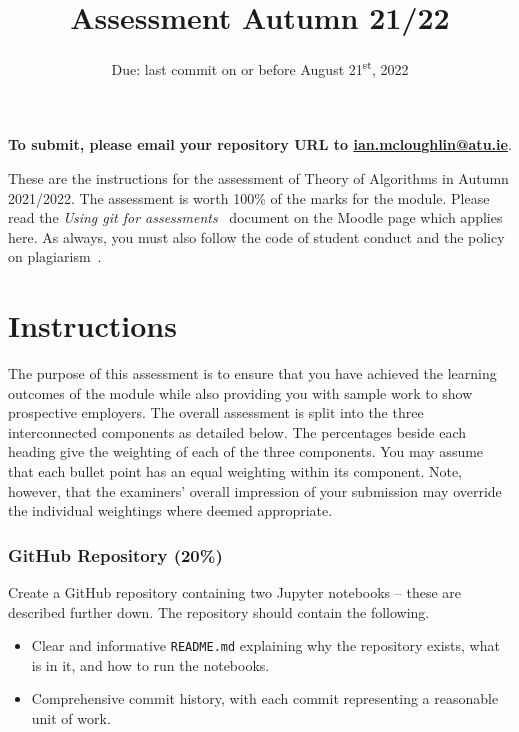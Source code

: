 \documentclass[a4paper, 12pt]{scrartcl}
\title{Assessment Autumn 21/22}
\author{}
\date{Due: last commit on or before August 21\textsuperscript{st}, 2022}
\begin{document}
  
  \maketitle

  \vspace{-12mm}
  \begin{center} \textbf{To submit, please email your repository URL to \url{ian.mcloughlin@atu.ie}}. \end{center}


  \noindent These are the instructions for the assessment of Theory of Algorithms in Autumn 2021/2022.
  The assessment is worth 100\% of the marks for the module.
  Please read the \emph{Using git for assessments}~\cite{usinggit} document on the Moodle page which applies here.
  As always, you must also follow the code of student conduct and the policy on plagiarism~\cite{gmitqaf}.

  \section*{Instructions}
  
  The purpose of this assessment is to ensure that you have achieved the learning outcomes of the module while also providing you with sample work to show prospective employers.
  The overall assessment is split into the three interconnected components as detailed below.
  The percentages beside each heading give the weighting of each of the three components.
  You may assume that each bullet point has an equal weighting within its component.
  Note, however, that the examiners' overall impression of your submission may override the individual weightings where deemed appropriate.

  \subsubsection*{GitHub Repository (20\%)}
  Create a GitHub repository containing two Jupyter notebooks -- these are described further down.
  The repository should contain the following.
  \begin{itemize}
    \item Clear and informative \texttt{README.md} explaining why the repository exists, what is in it, and how to run the notebooks.
    \item Comprehensive commit history, with each commit representing a reasonable unit of work.
  \end{itemize}
\end{document}
